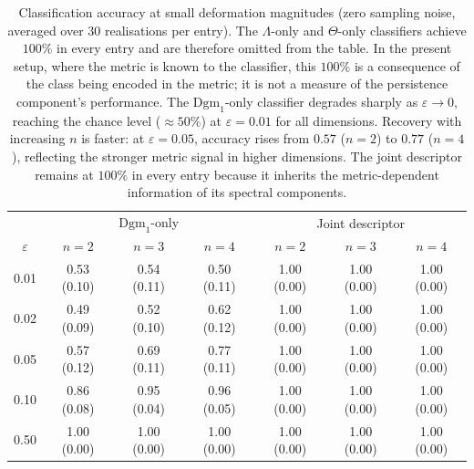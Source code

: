 \begin{table}[htbp]\centering
\caption{Classification accuracy at small deformation magnitudes (zero
sampling noise, averaged over 30 realisations per entry). The \(\Lambda\)-only
and \(\Theta\)-only classifiers achieve \(100\%\) in every entry and are
therefore omitted from the table. In the present setup, where the metric is
known to the classifier, this \(100\%\) is a consequence of the class being
encoded in the metric; it is not a measure of the persistence component's
performance. The \(\mathrm{Dgm}_1\)-only classifier degrades sharply as
\(\varepsilon \to 0\), reaching the chance level (\(\approx 50\%\)) at
\(\varepsilon=0.01\) for all dimensions. Recovery with increasing \(n\) is
faster: at \(\varepsilon=0.05\), accuracy rises from \(0.57\) (\(n=2\)) to
\(0.77\) (\(n=4\)), reflecting the stronger metric signal in higher
dimensions. The joint descriptor remains at \(100\%\) in every entry because
it inherits the metric-dependent information of its spectral components.}
\label{tab:small-eps}
\small
\begin{tabular}{c|ccc|ccc}\hline
& \multicolumn{3}{c|}{\(\mathrm{Dgm}_1\)-only} & \multicolumn{3}{c}{Joint descriptor} \\
\(\varepsilon\) & \(n=2\) & \(n=3\) & \(n=4\) & \(n=2\) & \(n=3\) & \(n=4\) \\\hline
0.01 & 0.53 (0.10) & 0.54 (0.11) & 0.50 (0.11) & 1.00 (0.00) & 1.00 (0.00) & 1.00 (0.00) \\
0.02 & 0.49 (0.09) & 0.52 (0.10) & 0.62 (0.12) & 1.00 (0.00) & 1.00 (0.00) & 1.00 (0.00) \\
0.05 & 0.57 (0.12) & 0.69 (0.11) & 0.77 (0.11) & 1.00 (0.00) & 1.00 (0.00) & 1.00 (0.00) \\
0.10 & 0.86 (0.08) & 0.95 (0.04) & 0.96 (0.05) & 1.00 (0.00) & 1.00 (0.00) & 1.00 (0.00) \\
0.50 & 1.00 (0.00) & 1.00 (0.00) & 1.00 (0.00) & 1.00 (0.00) & 1.00 (0.00) & 1.00 (0.00) \\
\hline\end{tabular}\end{table}